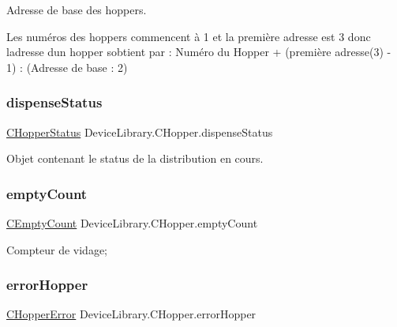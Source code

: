 Adresse de base des hoppers. 

Les numéros des hoppers commencent à 1 et la première adresse est 3 donc l\textquotesingle{}adresse d\textquotesingle{}un hopper s\textquotesingle{}obtient par \+: Numéro du Hopper + (première adresse(3) -\/ 1) \+: (Adresse de base \+: 2) \mbox{\label{class_device_library_1_1_c_hopper_ab1706fc6c299ceacbbc2d16a11229f41}} 
\subsubsection{\texorpdfstring{dispense\+Status}{dispenseStatus}}
{\footnotesize\ttfamily \mbox{\hyperlink{class_device_library_1_1_c_hopper_1_1_c_hopper_status}{C\+Hopper\+Status}} Device\+Library.\+C\+Hopper.\+dispense\+Status}



Objet contenant le status de la distribution en cours. 

\mbox{\label{class_device_library_1_1_c_hopper_aa38216ffa60bf350c59c59af0de3fa7b}} 
\subsubsection{\texorpdfstring{empty\+Count}{emptyCount}}
{\footnotesize\ttfamily \mbox{\hyperlink{class_device_library_1_1_c_hopper_1_1_c_empty_count}{C\+Empty\+Count}} Device\+Library.\+C\+Hopper.\+empty\+Count}



Compteur de vidage; 

\mbox{\label{class_device_library_1_1_c_hopper_ad9d867e3315d21fea58b64b696fa8d17}} 
\subsubsection{\texorpdfstring{error\+Hopper}{errorHopper}}
{\footnotesize\ttfamily \mbox{\hyperlink{class_device_library_1_1_c_hopper_1_1_c_hopper_error}{C\+Hopper\+Error}} Device\+Library.\+C\+Hopper.\+error\+Hopper}



